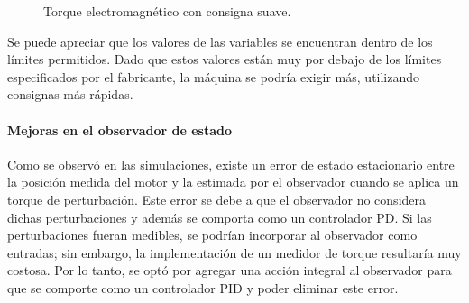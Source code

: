 \documentclass[a4paper, 10pt, onecolumn,journal]{ieeeconf}
\begin{document}
\begin{figure}[H]
	\centering
	\begin{adjustbox}{scale=0.5,max width=\columnwidth}
	\end{adjustbox}
	\caption{Torque electromagnético con consigna suave.}
	\label{Torque electromagnético con consigna suave}
\end{figure}
Se puede apreciar que los valores de las variables se encuentran dentro de los límites permitidos. Dado que estos valores están muy por debajo de los límites especificados por el fabricante, la máquina se podría exigir más, utilizando consignas más rápidas.
\paragraph{\textbf{Mejoras en el observador de estado}} 
Como se observó en las simulaciones, existe un error de estado estacionario entre la posición medida del motor y la estimada por el observador cuando se aplica un torque de perturbación. Este error se debe a que el observador no considera dichas perturbaciones y además se comporta como un controlador PD. Si las perturbaciones fueran medibles, se podrían incorporar al observador como entradas; sin embargo, la implementación de un medidor de torque resultaría muy costosa. Por lo tanto, se optó por agregar una acción integral al observador para que se comporte como un controlador PID y poder eliminar este error.
\end{document}
